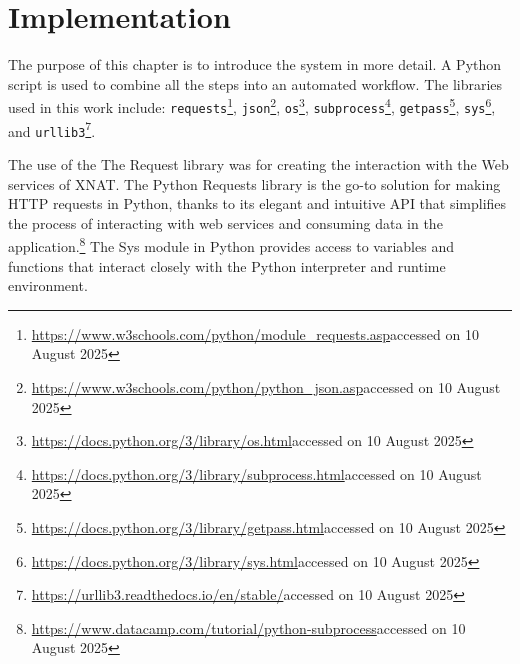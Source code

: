 

\chapter{Implementation}

The purpose of this chapter is to introduce the system in more detail. A Python script is used to combine all the steps into an automated workflow. The libraries used in this work include: \texttt{requests}\footnote{\url{https://www.w3schools.com/python/module_requests.asp}accessed on 10 August 2025}, \texttt{json}\footnote{\url{https://www.w3schools.com/python/python_json.asp}accessed on 10 August 2025}, \texttt{os}\footnote{\url{https://docs.python.org/3/library/os.html}accessed on 10 August 2025}, \texttt{subprocess}\footnote{\url{https://docs.python.org/3/library/subprocess.html}accessed on 10 August 2025}, \texttt{getpass}\footnote{\url{https://docs.python.org/3/library/getpass.html}accessed on 10 August 2025}, \texttt{sys}\footnote{\url{https://docs.python.org/3/library/sys.html}accessed on 10 August 2025}, and \texttt{urllib3}\footnote{\url{https://urllib3.readthedocs.io/en/stable/}accessed on 10 August 2025}.

The use of the The Request library was for creating the interaction with the Web services of XNAT. The Python Requests library is the go-to solution for making HTTP requests in Python, thanks to its elegant and intuitive API that simplifies the process of interacting with web services and consuming data in the application.\footnote{\url{https://www.datacamp.com/tutorial/python-subprocess}accessed on 10 August 2025} The Sys module in Python provides access to variables and functions that interact closely with the Python interpreter and runtime environment. 

